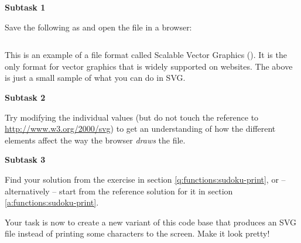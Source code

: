 \textbf{Subtask 1}

Save the following as  and open the file in a browser:
\inputminted[fontsize=\footnotesize]{xml}{\context/question/example.svg}

This is an example of a file format called Scalable Vector Graphics (). It is the only format for vector graphics that is widely supported on websites. The above is just a small sample of what you can do in SVG.

\textbf{Subtask 2}

Try modifying the individual values ​​(but do not touch the reference to \url{http://www.w3.org/2000/svg}) to get an understanding of how the different elements affect the way the browser \textsl{draws} the file.

\textbf{Subtask 3}

Find your solution from the exercise in section \ref{q:functions:sudoku-print}, or -- alternatively -- start from the reference solution for it in section \ref{a:functions:sudoku-print}.

Your task is now to create a new variant of this code base that produces an SVG file instead of printing some characters to the screen. Make it look pretty!
